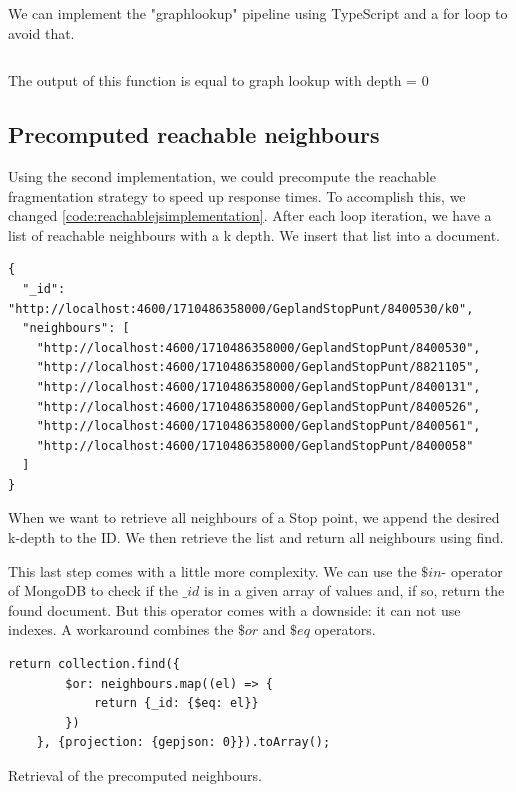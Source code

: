 We can implement the "graphlookup" pipeline using TypeScript and a for loop to avoid that. 

\begin{listing}[H]
    \inputminted[linenos,frame=single,breaklines]{TypeScript}{code/one_lookup_pipeline.ts}
    \caption{The output of this function is equal to graph lookup with depth = 0}
    \label{code:reachablejsimplementation}
\end{listing}


\subsection{Precomputed reachable neighbours}
Using the second implementation, we could precompute the reachable fragmentation strategy to speed up response times. To accomplish this, we changed \autoref{code:reachablejsimplementation}. After each loop iteration, we have a list of reachable neighbours with a k depth. We insert that list into a document. 

\begin{listing}[H]
    \begin{verbatim}
{
  "_id": "http://localhost:4600/1710486358000/GeplandStopPunt/8400530/k0",
  "neighbours": [
    "http://localhost:4600/1710486358000/GeplandStopPunt/8400530",
    "http://localhost:4600/1710486358000/GeplandStopPunt/8821105",
    "http://localhost:4600/1710486358000/GeplandStopPunt/8400131",
    "http://localhost:4600/1710486358000/GeplandStopPunt/8400526",
    "http://localhost:4600/1710486358000/GeplandStopPunt/8400561",
    "http://localhost:4600/1710486358000/GeplandStopPunt/8400058"
  ]
}
    \end{verbatim}
\end{listing}

When we want to retrieve all neighbours of a Stop point, we append the desired k-depth to the ID. We then retrieve the list and return all neighbours using find.

This last step comes with a little more complexity. We can use the $\$in$- operator of MongoDB to check if the $\_id$ is in a given array of values and, if so, return the found document. But this operator comes with a downside: it can not use indexes. A workaround combines the $\$or$ and $\$eq$ operators.
\begin{listing}[H]
\begin{verbatim}
return collection.find({
        $or: neighbours.map((el) => {
            return {_id: {$eq: el}}
        })
    }, {projection: {gepjson: 0}}).toArray();
\end{verbatim}
\caption{Retrieval of the precomputed neighbours.}
\end{listing}
